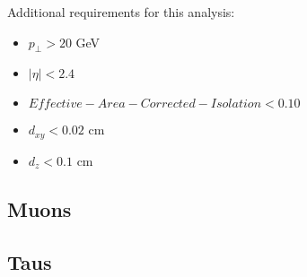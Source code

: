 Additional requirements for this analysis:
\begin{itemize}
  \item $ p_{\perp} > 20 $ GeV
  \item $ |\eta| < 2.4 $
  \item $ Effective-Area-Corrected-Isolation < 0.10 $
  \item $d_{xy}<0.02 $ cm
  \item $d_{z} < 0.1 $ cm
\end{itemize}


\subsection{Muons}




\subsection{Taus}

